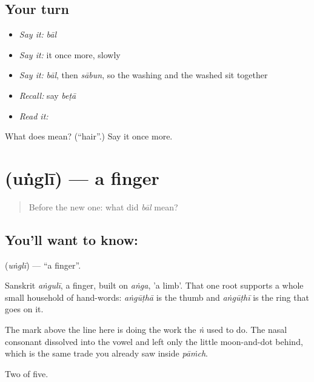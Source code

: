\subsection*{Your turn}
\begin{itemize}
\raggedright
  \item \emph{Say it:} \emph{bāl}
  \item \emph{Say it:} it once more, slowly
  \item \emph{Say it:} \emph{bāl}, then \emph{sābun}, so the washing and the washed sit together
  \item \emph{Recall:} say \emph{beṭā}
  \item \emph{Read it:} \textbf{}
\end{itemize}

\begin{tcolorbox}[breakable,colback=teal!4,colframe=teal!35!black,title={Before you move on}]
What does  mean? (\textquotedblleft{}hair\textquotedblright{}.) Say it once more.
\end{tcolorbox}
\section[\texorpdfstring{\hi{उँगली} (uṅglī)}{उँगली (uṅglī)}]{ (uṅglī) — a finger}

\label{lesson:HI-C46-finger}



\begin{quote}
Before the new one: what did \emph{bāl} mean?
\end{quote}

\subsection*{You'll want to know: }
\textbf{} (\emph{uṅglī}) — \textquotedblleft{}a finger\textquotedblright{}.

Sanskrit \emph{aṅgulī}, a finger, built on \emph{aṅga}, 'a limb'. That one root supports a whole small household of hand-words: \emph{aṅgūṭhā} is the thumb and \emph{aṅgūṭhī} is the ring that goes on it.

The mark above the line here is doing the work the \emph{ṅ} used to do. The nasal consonant dissolved into the vowel and left only the little moon-and-dot behind, which is the same trade you already saw inside \emph{pāṁch}.

\begin{grammarlens}[title={What you've built}]
Two of five.
\end{grammarlens}

